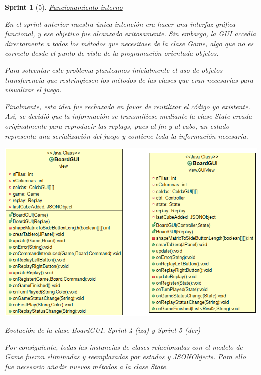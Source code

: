 \documentclass{article}
\theoremstyle{break}
\newtheorem*{sprint}{Sprint}
\begin{document}
\begin{sprint}[5]
\underline{Funcionamiento interno}

En el sprint anterior nuestra única intención era hacer una interfaz gráfica funcional, y ese objetivo fue alcanzado exitosamente. Sin embargo, la GUI accedía directamente a todos los métodos que necesitase de la clase \textit{Game}, algo que no es correcto desde el punto de vista de la programación orientada objetos.

Para solventar este problema planteamos inicialmente el uso de objetos transferencia que restringiesen los métodos de las clases que eran necesarias para visualizar el juego.

Finalmente, esta idea fue rechazada en favor de reutilizar el código ya existente. Así, se decidió que la información se transmitiese mediante la clase \textit{State} creada originalmente para reproducir las \textit{replays}, pues al fin y al cabo, un estado representa una serialización del juego y contiene toda la información necesaria.

\begin{center}
\includegraphics[scale=0.5]{board-gui-evol.png}

Evolución de la clase \textit{BoardGUI}. Sprint 4 (izq) y Sprint 5 (der)
\end{center}

Por consiguiente, todas las instancias de clases relacionadas con el modelo de \textit{Game} fueron eliminadas y reemplazadas por estados y JSONObjects. Para ello fue necesario añadir nuevos métodos a la clase \textit{State}.


\end{sprint}
\end{document}

